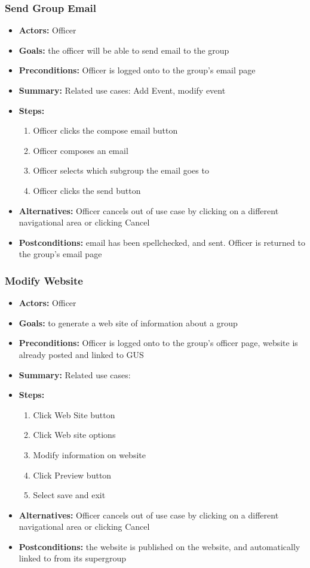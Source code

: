 \documentclass[12pt, oneside, letterpaper]{report}
\begin{document}
			\subsubsection{Send Group Email}
			\begin{itemize}
				\item{\textbf{Actors:} Officer}
				\item{\textbf{Goals:} the officer will be able to send email to the group}
				\item{\textbf{Preconditions:} Officer is logged onto to the group's email page}
				\item{\textbf{Summary:} Related use cases: Add Event, modify event}
				\item{\textbf{Steps:}
				\begin{enumerate}
					\item{Officer clicks the compose email button}
					\item{Officer composes an email}
					\item{Officer selects which subgroup the email goes to}
					\item{Officer clicks the send button}
				\end{enumerate}
				}
				\item{\textbf{Alternatives:} Officer cancels out of use case by clicking on a different navigational area or clicking Cancel}
				\item{\textbf{Postconditions:} email has been spellchecked, and sent.  Officer is returned to the group's email page}
			\end{itemize}
			\subsubsection{Modify Website}
			\begin{itemize}
				\item{\textbf{Actors:} Officer}
				\item{\textbf{Goals:}  to generate a web site of information about a group}
				\item{\textbf{Preconditions:} Officer is logged onto to the group's officer page, website is already posted and linked to GUS}
				\item{\textbf{Summary:} Related use cases: }
				\item{\textbf{Steps:}
				\begin{enumerate}
					\item{Click Web Site button}
					\item{Click Web site options}
					\item{Modify information on website}
					\item{Click Preview button}
					\item{Select save and exit}

				\end{enumerate}
				}
				\item{\textbf{Alternatives:} Officer cancels out of use case by clicking on a different navigational area or clicking Cancel}
				\item{\textbf{Postconditions:} the website is published on the website, and automatically linked to from its supergroup
}
			\end{itemize}
\end{document}
